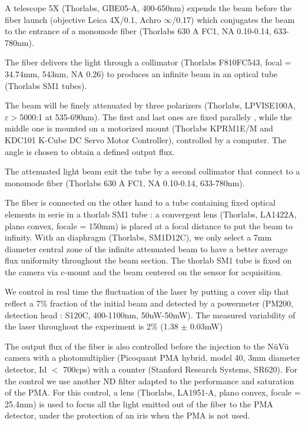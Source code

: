 \documentclass{article}
\begin{document}
A telescope 5X (Thorlabs, GBE05-A, 400-650nm) expends the beam before the fiber launch (objective Leica 4X/0.1, Achro $\infty$/0.17) which conjugates the beam to the entrance of a monomode fiber (Thorlabs 630 A FC1, NA 0.10-0.14, 633-780nm).

The fiber delivers the light through a collimator (Thorlabs F810FC543, focal = 34.74mm, 543nm, NA 0.26) to produces an infinite beam in an optical tube (Thorlabs SM1 tubes).

The beam will be finely attenuated by three  polarizers (Thorlabs, LPVISE100A, $\varepsilon >$5000:1 at 535-690nm). 
The first and last ones are fixed parallely , while the middle one is mounted on a motorized mount (Thorlabs KPRM1E/M and KDC101 K-Cube DC Servo Motor Controller), controlled by a computer.
The angle is chosen to obtain a defined output flux.

The attenuated light beam exit the tube by a second collimator that connect to a monomode fiber (Thorlabs 630 A FC1, NA 0.10-0.14, 633-780nm).

The fiber is connected on the other hand to a tube containing fixed optical elements in serie in a thorlab SM1 tube : a convergent lens (Thorlabs, LA1422A, plano convex, focale = 150mm) is placed at a focal distance to put the beam to infinity. 
With  an diaphragm (Thorlabs, SM1D12C), we only select a 7mm diameter central zone of the infinite attenuated beam to have a better average flux uniformity throughout the beam section.
The thorlab SM1 tube is fixed on the camera via c-mount and the beam centered on the sensor for acquisition.

We control in real time the fluctuation of the laser by putting a cover slip that reflect a 7$\%$ fraction of the initial beam and detected by a powermeter (PM200, detection head : S120C, 400-1100nm, 50nW-50mW).
The measured variability of the laser throughout the experiment is 2$\%$ (1.38 $\pm$ 0.03mW)

The output flux of the fiber is also controlled before the injection to the NüVü camera with a photomultiplier (Picoquant PMA hybrid, model 40, 3mm diameter detector, Id $<$ 700cps) with a counter (Stanford Research Systems, SR620). For the control we use another ND filter adapted to the performance and saturation of the PMA.
For this control, a lens (Thorlabs, LA1951-A,  plano convex, focale = 25.4mm) is used to focus all the light emitted out of the fiber to the PMA detector, under the protection of an iris when the PMA is not used.
\end{document}
